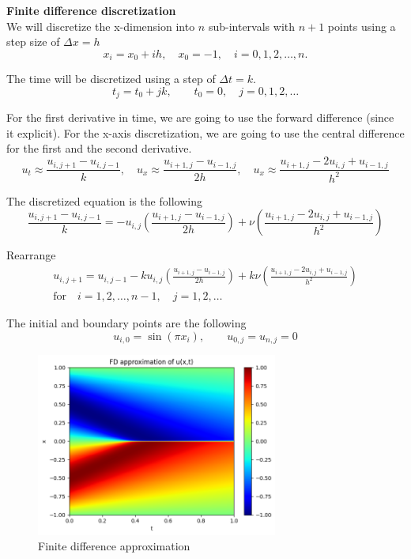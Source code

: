 \documentclass[a4paper,12pt]{article}
\theoremstyle{definition}
\begin{document}
\textbf{Finite difference discretization}\\
We will discretize the x-dimension into $n$ sub-intervals with $n+1$ points using a step size of $\Delta x = h$
$$
x_i = x_0 + ih, \quad x_0 = -1, \quad i = 0, 1, 2, \dots, n.
$$  

The time will be discretized using a step of $\Delta t = k$.
$$
t_j = t_0 + jk, \qquad t_0 = 0, \quad j = 0, 1, 2, \dots
$$

For the first derivative in time, we are going to use the forward difference (since it explicit). 
For the x-axis discretization, we are going to use the central difference for the first and the second derivative.
$$
u_t \approx \frac{u_{i,j+1} - u_{i, j-1}}{k}, \quad
u_x \approx \frac{ u_{i+1,j} - u_{i-1,j} }{2h}, \quad
u_x \approx \frac{ u_{i+1,j} - 2 u_{i,j} + u_{i-1,j} }{h^2}
$$

The discretized equation is the following
\begin{equation}
\frac{u_{i,j+1} - u_{i, j-1}}{k} =
- u_{i,j} \left( \frac{ u_{i+1,j} - u_{i-1,j} }{2h} \right)
+ \nu \left( \frac{ u_{i+1,j} - 2 u_{i,j} + u_{i-1,j} }{h^2} \right)
\end{equation}

Rearrange
\begin{multline}
u_{i,j+1}  = u_{i, j-1}
- k u_{i,j} \left( \frac{ u_{i+1,j} - u_{i-1,j} }{2h} \right)
+ k \nu \left( \frac{ u_{i+1,j} - 2 u_{i,j} + u_{i-1,j} }{h^2} \right)
\\ \text{for} \quad i=1, 2, \dots, n-1,  \quad j = 1, 2, \dots
\end{multline}

The initial and boundary points are the following
$$
u_{i,0} = \sin(\pi x_i), \qquad u_{0,j} = u_{n,j} = 0
$$

\begin{figure}
    \centering
    \includegraphics[width=300px]{images/FD_burgers_pde.png}
    \vspace{-1em}
    \caption{Finite difference approximation}
    \label{fd_burgers}
\end{figure}
\end{document}
